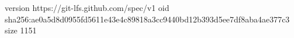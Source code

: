 version https://git-lfs.github.com/spec/v1
oid sha256:ae0a5d8d0955fd5611e43e4c89818a3cc9440bd12b393d5ee7df8aba4ae377c3
size 1151
